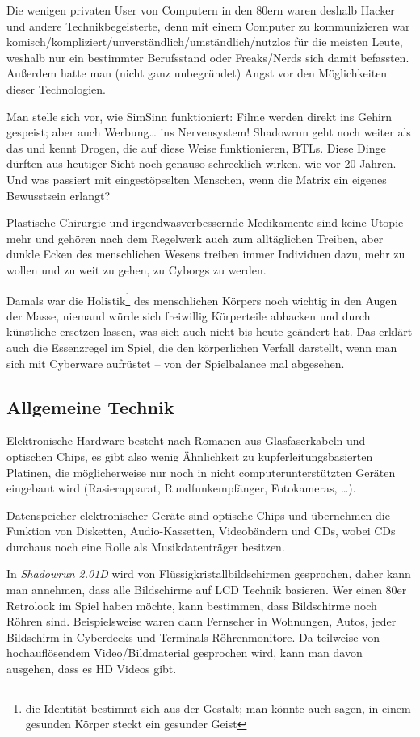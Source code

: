 \documentclass[a4paper]{scrartcl}
\begin{document}
Die wenigen privaten User von Computern in den 80ern waren deshalb Hacker und andere Technikbegeisterte, denn mit einem
Computer zu kommunizieren war komisch/kompliziert/unverständlich/umständlich/nutzlos für die meisten Leute, 
weshalb nur ein bestimmter Berufsstand oder Freaks/Nerds sich damit befassten.
Außerdem hatte man (nicht ganz unbegründet) Angst vor den Möglichkeiten dieser Technologien.

Man stelle sich vor, wie SimSinn funktioniert: Filme werden direkt ins Gehirn gespeist; aber auch Werbung\dots 
ins Nervensystem! Shadowrun geht noch weiter als das und kennt Drogen, die auf diese Weise funktionieren, BTLs.
Diese Dinge dürften aus heutiger Sicht noch genauso schrecklich wirken, wie vor 20 Jahren.
Und was passiert mit eingestöpselten Menschen, wenn die Matrix ein eigenes Bewusstsein erlangt?

Plastische Chirurgie und irgendwasverbessernde Medikamente sind keine Utopie mehr und gehören nach dem Regelwerk auch zum
alltäglichen Treiben, aber dunkle Ecken des menschlichen Wesens treiben immer Individuen dazu, mehr zu wollen und zu weit
zu gehen, zu Cyborgs zu werden.

Damals war die Holistik\footnote{die Identität bestimmt sich aus der Gestalt; man könnte auch sagen, in einem gesunden
Körper steckt ein gesunder Geist} des menschlichen Körpers noch wichtig in den Augen der Masse, niemand würde sich 
freiwillig Körperteile abhacken und durch künstliche ersetzen lassen, was sich auch nicht bis heute geändert hat.
Das erklärt auch die Essenzregel im Spiel, die den körperlichen Verfall darstellt, wenn man sich mit Cyberware aufrüstet 
-- von der Spielbalance mal abgesehen.

\subsection{Allgemeine Technik}
Elektronische Hardware besteht nach Romanen aus Glasfaserkabeln und optischen Chips, es gibt also wenig Ähnlichkeit
zu kupferleitungsbasierten Platinen, die möglicherweise nur noch in nicht computerunterstützten Geräten eingebaut
wird (Rasierapparat, Rundfunkempfänger, Fotokameras, \dots).

Datenspeicher elektronischer Geräte sind optische Chips und übernehmen die Funktion von Disketten, Audio-Kassetten, Videobändern und CDs, wobei CDs durchaus noch eine Rolle als Musikdatenträger besitzen.

In \textit{Shadowrun 2.01D} wird von Flüssigkristallbildschirmen gesprochen, daher kann man annehmen, dass alle Bildschirme
auf LCD Technik basieren. 
Wer einen 80er Retrolook im Spiel haben möchte, kann bestimmen, dass Bildschirme noch Röhren sind.
Beispielsweise waren dann Fernseher in Wohnungen, Autos, jeder Bildschirm in Cyberdecks und Terminals Röhrenmonitore.
Da teilweise von hochauflösendem Video/Bildmaterial gesprochen wird, kann man davon ausgehen, dass es HD Videos gibt.
\end{document}
